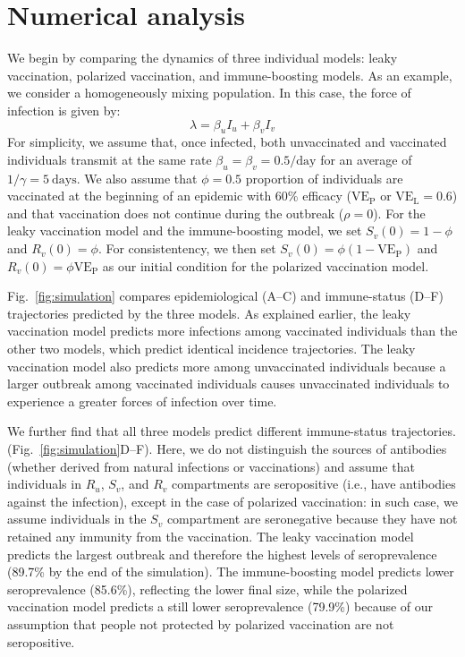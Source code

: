 \documentclass[12pt]{article}
\newcommand{\fref}[1]{Fig.~\ref{fig:#1}}
\newcommand{\VE}{\ensuremath{\mathrm{VE}}}
\newcommand{\VEP}{\ensuremath{\VE_{\mathrm{P}}}}
\newcommand{\VEL}{\ensuremath{\VE_{\mathrm{L}}}}
\begin{document}
\section*{Numerical analysis}

We begin by comparing the dynamics of three individual models: leaky vaccination, polarized vaccination, and immune-boosting models.
As an example, we consider a homogeneously mixing population. In this case, the force of infection is given by:
\begin{equation}
\lambda = \beta_u I_u + \beta_v I_v
\end{equation}
For simplicity, we assume that, once infected, both unvaccinated and vaccinated individuals transmit at the same rate $\beta_u = \beta_v =0.5/\mathrm{day}$ for an average of $1/\gamma=5~\mathrm{days}$.
We also assume that $\phi = 0.5$ proportion of individuals are vaccinated at the beginning of an epidemic with 60\% efficacy ($\VEP$ or $\VEL=0.6$) and that vaccination does not continue during the outbreak ($\rho = 0$).
For the leaky vaccination model and the immune-boosting model, we set $S_v(0) = 1-\phi$ and $R_v(0) = \phi$.
For consistentency, we then set $S_v(0) = \phi (1-\VEP)$ and $R_v(0) = \phi \VEP$ as our initial condition for the polarized vaccination model.

\fref{simulation} compares epidemiological (A--C) and immune-status (D--F) trajectories predicted by the three models.
As explained earlier, the leaky vaccination model predicts more infections among vaccinated individuals than the other two models, which predict identical incidence trajectories.
The leaky vaccination model also predicts more among unvaccinated individuals because a larger outbreak among vaccinated individuals causes unvaccinated individuals to experience a greater forces of infection over time.

We further find that all three models predict different immune-status trajectories. (\fref{simulation}D--F). 
Here, we do not distinguish the sources of antibodies (whether derived from natural infections or vaccinations) and assume that individuals in $R_u$, $S_v$, and $R_v$ compartments are seropositive (i.e., have antibodies against the infection), except in the case of polarized vaccination:
in such case, we assume individuals in the $S_v$ compartment are seronegative because they have not retained any immunity from the vaccination.
The leaky vaccination model predicts the largest outbreak and therefore the highest levels of seroprevalence (89.7\% by the end of the simulation).
The immune-boosting model predicts lower seroprevalence (85.6\%), reflecting the lower final size, while 
the polarized vaccination model predicts a still lower seroprevalence (79.9\%) because of our assumption that people not protected by polarized vaccination are not seropositive.
\end{document}
